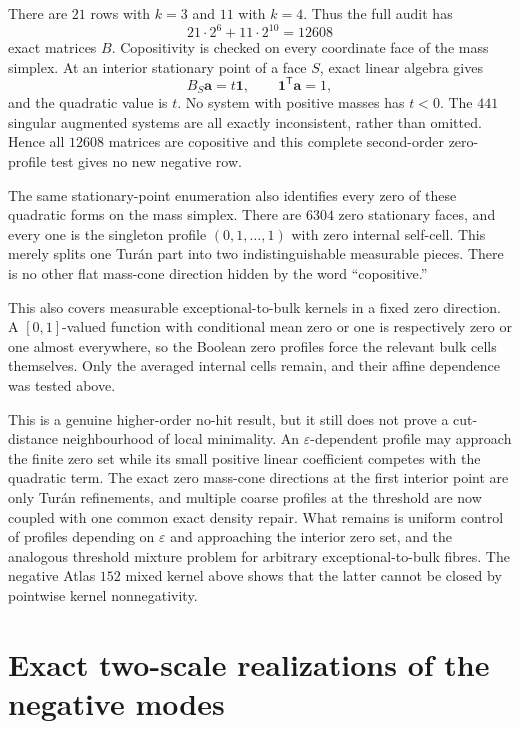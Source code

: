\documentclass[11pt]{article}
\begin{document}
There are $21$ rows with $k=3$ and $11$ with $k=4$.  Thus the full audit has
\[
 21\cdot2^6+11\cdot2^{10}=12608
\]
exact matrices $B$.  Copositivity is checked on every coordinate face of the
mass simplex.  At an interior stationary point of a face $S$, exact linear
algebra gives
\[
 B_S\boldsymbol a=t\boldsymbol1,
 \qquad \boldsymbol1^{\mathsf T}\boldsymbol a=1,
\]
and the quadratic value is $t$.  No system with positive masses has $t<0$.
The $441$ singular augmented systems are all exactly inconsistent, rather
than omitted.  Hence all $12608$ matrices are copositive and this complete
second-order zero-profile test gives no new negative row.

The same stationary-point enumeration also identifies every zero of these
quadratic forms on the mass simplex.  There are $6304$ zero stationary
faces, and every one is the singleton profile $(0,1,\ldots,1)$ with zero
internal self-cell.  This merely splits one Tur\'an part into two
indistinguishable measurable pieces.  There is no other flat mass-cone
direction hidden by the word ``copositive.''

This also covers measurable exceptional-to-bulk kernels in a fixed zero
direction.  A $[0,1]$-valued function with conditional mean zero or one is
respectively zero or one almost everywhere, so the Boolean zero profiles
force the relevant bulk cells themselves.  Only the averaged internal cells
remain, and their affine dependence was tested above.

This is a genuine higher-order no-hit result, but it still does not prove a
cut-distance neighbourhood of local minimality.  An
$\varepsilon$-dependent profile may approach the finite zero set while its
small positive linear coefficient competes with the quadratic term.  The
exact zero mass-cone directions at the first interior point are only
Tur\'an refinements, and multiple coarse profiles at the threshold are now
coupled with one common exact density repair.  What remains is uniform
control of profiles depending on $\varepsilon$ and approaching the interior
zero set, and the analogous threshold mixture problem for arbitrary
exceptional-to-bulk fibres.  The negative Atlas $152$ mixed kernel above
shows that the latter cannot be closed by pointwise kernel nonnegativity.


\section{Exact two-scale realizations of the negative modes}
\end{document}
